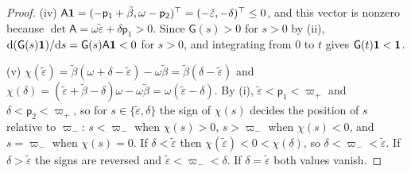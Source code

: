 \begin{proof}
(iv) $\mathsf A\mathbf{1}=(-\mathsf p_1+\tilde\beta,\omega-\mathsf p_2)^\top=(-\tilde\varepsilon,-\delta)^\top\le0$, and this vector is nonzero because $\det\mathsf A=\omega\tilde\varepsilon+\delta\mathsf p_1>0$. Since $\mathsf G(s)>0$ for $s>0$ by (ii), $\mathrm d(\mathsf G(s)\mathbf{1})/\mathrm ds=\mathsf G(s)\mathsf A\mathbf{1}<0$ for $s>0$, and integrating from $0$ to $t$ gives $\mathsf G(t)\mathbf{1}<\mathbf{1}$.

(v) $\chi(\tilde\varepsilon)=\tilde\beta(\omega+\delta-\tilde\varepsilon)-\omega\tilde\beta=\tilde\beta(\delta-\tilde\varepsilon)$ and $\chi(\delta)=(\tilde\varepsilon+\tilde\beta-\delta)\omega-\omega\tilde\beta=\omega(\tilde\varepsilon-\delta)$. By (i), $\tilde\varepsilon<\mathsf p_1<\varpi_+$ and $\delta<\mathsf p_2<\varpi_+$, so for $s\in\{\tilde\varepsilon,\delta\}$ the sign of $\chi(s)$ decides the position of $s$ relative to $\varpi_-$: $s<\varpi_-$ when $\chi(s)>0$, $s>\varpi_-$ when $\chi(s)<0$, and $s=\varpi_-$ when $\chi(s)=0$. If $\delta<\tilde\varepsilon$ then $\chi(\tilde\varepsilon)<0<\chi(\delta)$, so $\delta<\varpi_-<\tilde\varepsilon$. If $\delta>\tilde\varepsilon$ the signs are reversed and $\tilde\varepsilon<\varpi_-<\delta$. If $\delta=\tilde\varepsilon$ both values vanish.
\end{proof}

